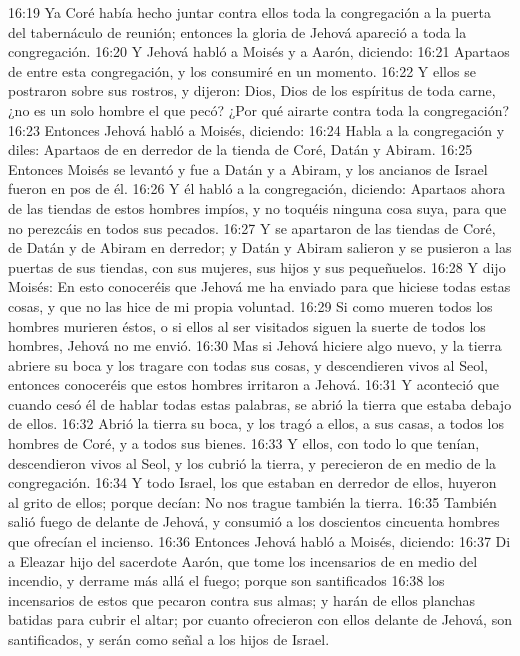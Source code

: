 16:19 Ya Coré había hecho juntar contra ellos toda la congregación a la puerta del tabernáculo de reunión; entonces la gloria de Jehová apareció a toda la congregación.  
16:20 Y Jehová habló a Moisés y a Aarón, diciendo:  
16:21 Apartaos de entre esta congregación, y los consumiré en un momento.  
16:22 Y ellos se postraron sobre sus rostros, y dijeron: Dios, Dios de los espíritus de toda carne, ¿no es un solo hombre el que pecó? ¿Por qué airarte contra toda la congregación?  
16:23 Entonces Jehová habló a Moisés, diciendo:  
16:24 Habla a la congregación y diles: Apartaos de en derredor de la tienda de Coré, Datán y Abiram.  
16:25 Entonces Moisés se levantó y fue a Datán y a Abiram, y los ancianos de Israel fueron en pos de él.  
16:26 Y él habló a la congregación, diciendo: Apartaos ahora de las tiendas de estos hombres impíos, y no toquéis ninguna cosa suya, para que no perezcáis en todos sus pecados.  
16:27 Y se apartaron de las tiendas de Coré, de Datán y de Abiram en derredor; y Datán y Abiram salieron y se pusieron a las puertas de sus tiendas, con sus mujeres, sus hijos y sus pequeñuelos.  
16:28 Y dijo Moisés: En esto conoceréis que Jehová me ha enviado para que hiciese todas estas cosas, y que no las hice de mi propia voluntad.  
16:29 Si como mueren todos los hombres murieren éstos, o si ellos al ser visitados siguen la suerte de todos los hombres, Jehová no me envió.  
16:30 Mas si Jehová hiciere algo nuevo, y la tierra abriere su boca y los tragare con todas sus cosas, y descendieren vivos al Seol, entonces conoceréis que estos hombres irritaron a Jehová.  
16:31 Y aconteció que cuando cesó él de hablar todas estas palabras, se abrió la tierra que estaba debajo de ellos.  
16:32 Abrió la tierra su boca, y los tragó a ellos, a sus casas, a todos los hombres de Coré, y a todos sus bienes.  
16:33 Y ellos, con todo lo que tenían, descendieron vivos al Seol, y los cubrió la tierra, y perecieron de en medio de la congregación.  
16:34 Y todo Israel, los que estaban en derredor de ellos, huyeron al grito de ellos; porque decían: No nos trague también la tierra. 
16:35 También salió fuego de delante de Jehová, y consumió a los doscientos cincuenta hombres que ofrecían el incienso.  
16:36 Entonces Jehová habló a Moisés, diciendo:  
16:37 Di a Eleazar hijo del sacerdote Aarón, que tome los incensarios de en medio del incendio, y derrame más allá el fuego; porque son santificados  
16:38 los incensarios de estos que pecaron contra sus almas; y harán de ellos planchas batidas para cubrir el altar; por cuanto ofrecieron con ellos delante de Jehová, son santificados, y serán como señal a los hijos de Israel.  
